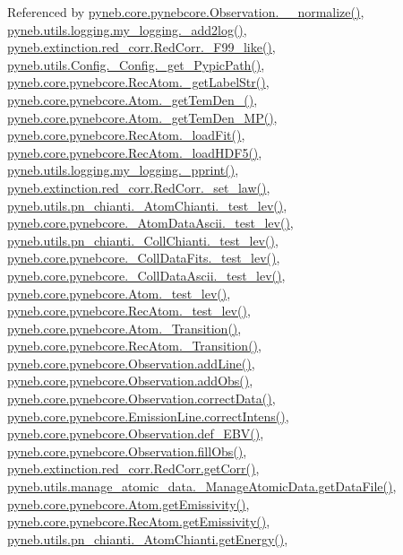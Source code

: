 Referenced by \hyperlink{pynebcore_8py_source_l04007}{pyneb.\-core.\-pynebcore.\-Observation.\-\_\-\-\_\-normalize()}, \hyperlink{logging_8py_source_l00059}{pyneb.\-utils.\-logging.\-my\-\_\-logging.\-\_\-add2log()}, \hyperlink{red__corr_8py_source_l00658}{pyneb.\-extinction.\-red\-\_\-corr.\-Red\-Corr.\-\_\-\-F99\-\_\-like()}, \hyperlink{_config_8py_source_l00115}{pyneb.\-utils.\-Config.\-\_\-\-Config.\-\_\-get\-\_\-\-Pypic\-Path()}, \hyperlink{pynebcore_8py_source_l02970}{pyneb.\-core.\-pynebcore.\-Rec\-Atom.\-\_\-get\-Label\-Str()}, \hyperlink{pynebcore_8py_source_l01869}{pyneb.\-core.\-pynebcore.\-Atom.\-\_\-get\-Tem\-Den\-\_()}, \hyperlink{pynebcore_8py_source_l02046}{pyneb.\-core.\-pynebcore.\-Atom.\-\_\-get\-Tem\-Den\-\_\-\-M\-P()}, \hyperlink{pynebcore_8py_source_l02754}{pyneb.\-core.\-pynebcore.\-Rec\-Atom.\-\_\-load\-Fit()}, \hyperlink{pynebcore_8py_source_l02714}{pyneb.\-core.\-pynebcore.\-Rec\-Atom.\-\_\-load\-H\-D\-F5()}, \hyperlink{logging_8py_source_l00051}{pyneb.\-utils.\-logging.\-my\-\_\-logging.\-\_\-pprint()}, \hyperlink{red__corr_8py_source_l00176}{pyneb.\-extinction.\-red\-\_\-corr.\-Red\-Corr.\-\_\-set\-\_\-law()}, \hyperlink{pn__chianti_8py_source_l00304}{pyneb.\-utils.\-pn\-\_\-chianti.\-\_\-\-Atom\-Chianti.\-\_\-test\-\_\-lev()}, \hyperlink{pynebcore_8py_source_l00447}{pyneb.\-core.\-pynebcore.\-\_\-\-Atom\-Data\-Ascii.\-\_\-test\-\_\-lev()}, \hyperlink{pn__chianti_8py_source_l00472}{pyneb.\-utils.\-pn\-\_\-chianti.\-\_\-\-Coll\-Chianti.\-\_\-test\-\_\-lev()}, \hyperlink{pynebcore_8py_source_l00677}{pyneb.\-core.\-pynebcore.\-\_\-\-Coll\-Data\-Fits.\-\_\-test\-\_\-lev()}, \hyperlink{pynebcore_8py_source_l01045}{pyneb.\-core.\-pynebcore.\-\_\-\-Coll\-Data\-Ascii.\-\_\-test\-\_\-lev()}, \hyperlink{pynebcore_8py_source_l01525}{pyneb.\-core.\-pynebcore.\-Atom.\-\_\-test\-\_\-lev()}, \hyperlink{pynebcore_8py_source_l02672}{pyneb.\-core.\-pynebcore.\-Rec\-Atom.\-\_\-test\-\_\-lev()}, \hyperlink{pynebcore_8py_source_l01433}{pyneb.\-core.\-pynebcore.\-Atom.\-\_\-\-Transition()}, \hyperlink{pynebcore_8py_source_l02812}{pyneb.\-core.\-pynebcore.\-Rec\-Atom.\-\_\-\-Transition()}, \hyperlink{pynebcore_8py_source_l03558}{pyneb.\-core.\-pynebcore.\-Observation.\-add\-Line()}, \hyperlink{pynebcore_8py_source_l03589}{pyneb.\-core.\-pynebcore.\-Observation.\-add\-Obs()}, \hyperlink{pynebcore_8py_source_l04028}{pyneb.\-core.\-pynebcore.\-Observation.\-correct\-Data()}, \hyperlink{pynebcore_8py_source_l03447}{pyneb.\-core.\-pynebcore.\-Emission\-Line.\-correct\-Intens()}, \hyperlink{pynebcore_8py_source_l03983}{pyneb.\-core.\-pynebcore.\-Observation.\-def\-\_\-\-E\-B\-V()}, \hyperlink{pynebcore_8py_source_l03574}{pyneb.\-core.\-pynebcore.\-Observation.\-fill\-Obs()}, \hyperlink{red__corr_8py_source_l00211}{pyneb.\-extinction.\-red\-\_\-corr.\-Red\-Corr.\-get\-Corr()}, \hyperlink{manage__atomic__data_8py_source_l00297}{pyneb.\-utils.\-manage\-\_\-atomic\-\_\-data.\-\_\-\-Manage\-Atomic\-Data.\-get\-Data\-File()}, \hyperlink{pynebcore_8py_source_l01782}{pyneb.\-core.\-pynebcore.\-Atom.\-get\-Emissivity()}, \hyperlink{pynebcore_8py_source_l02990}{pyneb.\-core.\-pynebcore.\-Rec\-Atom.\-get\-Emissivity()}, \hyperlink{pn__chianti_8py_source_l00366}{pyneb.\-utils.\-pn\-\_\-chianti.\-\_\-\-Atom\-Chianti.\-get\-Energy()}, 